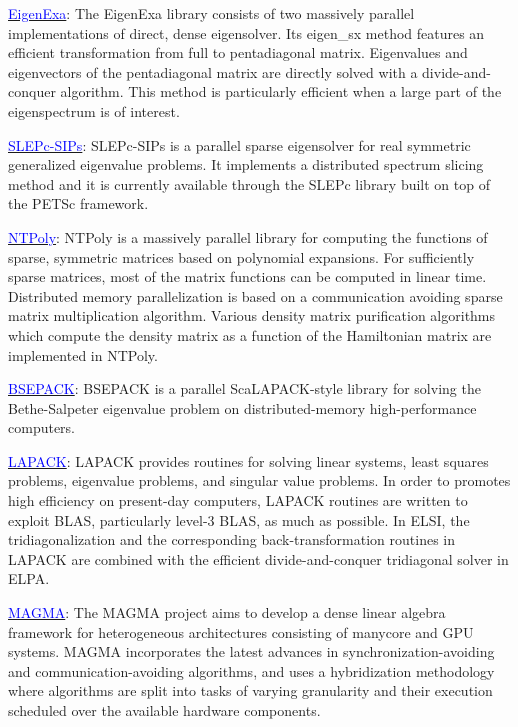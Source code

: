 \documentclass{report}
\newcommand{\tcb}[1]{\textcolor{blue}{#1}}
\begin{document}
\href{https://www.r-ccs.riken.jp/labs/lpnctrt/projects/eigenexa}{\tcb{EigenExa}}: The EigenExa library consists of two massively parallel implementations of direct, dense eigensolver. Its eigen\_sx method features an efficient transformation from full to pentadiagonal matrix. Eigenvalues and eigenvectors of the pentadiagonal matrix are directly solved with a divide-and-conquer algorithm. This method is particularly efficient when a large part of the eigenspectrum is of interest.

\href{http://slepc.upv.es}{\tcb{SLEPc-SIPs}}: SLEPc-SIPs is a parallel sparse eigensolver for real symmetric generalized eigenvalue problems. It implements a distributed spectrum slicing method and it is currently available through the SLEPc library built on top of the PETSc framework.

\href{https://william-dawson.github.io/NTPoly}{\tcb{NTPoly}}: NTPoly is a massively parallel library for computing the functions of sparse, symmetric matrices based on polynomial expansions. For sufficiently sparse matrices, most of the matrix functions can be computed in linear time. Distributed memory parallelization is based on a communication avoiding sparse matrix multiplication algorithm. Various density matrix purification algorithms which compute the density matrix as a function of the Hamiltonian matrix are implemented in NTPoly.

\href{https://sites.google.com/a/lbl.gov/bsepack}{\tcb{BSEPACK}}: BSEPACK is a parallel ScaLAPACK-style library for solving the Bethe-Salpeter eigenvalue problem on distributed-memory high-performance computers.

\href{https://www.netlib.org/lapack}{\tcb{LAPACK}}: LAPACK provides routines for solving linear systems, least squares problems, eigenvalue problems, and singular value problems. In order to promotes high efficiency on present-day computers, LAPACK routines are written to exploit BLAS, particularly level-3 BLAS, as much as possible. In ELSI, the tridiagonalization and the corresponding back-transformation routines in LAPACK are combined with the efficient divide-and-conquer tridiagonal solver in ELPA.

\href{https://icl.utk.edu/magma}{\tcb{MAGMA}}: The MAGMA project aims to develop a dense linear algebra framework for heterogeneous architectures consisting of manycore and GPU systems. MAGMA incorporates the latest advances in synchronization-avoiding and communication-avoiding algorithms, and uses a hybridization methodology where algorithms are split into tasks of varying granularity and their execution scheduled over the available hardware components.
\end{document}
